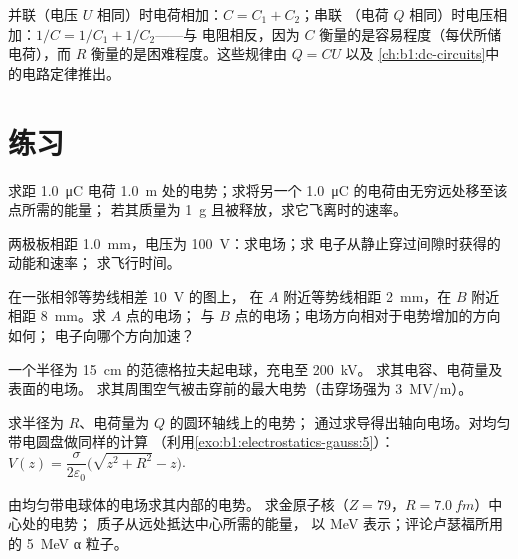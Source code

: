 \begin{remark}[电容器的组合]\label{rem:b1:potential-capacitors:association}
并联（电压 $U$ 相同）时电荷相加：$C = C_1 + C_2$；串联
（电荷 $Q$ 相同）时电压相加：$1/C = 1/C_1 + 1/C_2$——与
电阻相反，因为 $C$ 衡量的是容易程度（每伏所储电荷），而 $R$
衡量的是困难程度。这些规律由 $Q = CU$ 以及
\cref{ch:b1:dc-circuits}中的电路定律推出。
\end{remark}

\section{练习}

\begin{exercise}[$\star$]\label{exo:b1:potential-capacitors:1}
求距 \qty{1.0}{\micro C} 电荷 \qty{1.0}{m} 处的电势；求将另一个
\qty{1.0}{\micro C} 的电荷由无穷远处移至该点所需的能量；
若其质量为 \qty{1}{g} 且被释放，求它飞离时的速率。
\end{exercise}

\begin{exercise}[$\star$]\label{exo:b1:potential-capacitors:2}
两极板相距 \qty{1.0}{mm}，电压为 \qty{100}{V}：求电场；求
电子从静止穿过间隙时获得的动能和速率；
求飞行时间。
\end{exercise}

\begin{exercise}[$\star$]\label{exo:b1:potential-capacitors:3}
在一张相邻等势线相差 \qty{10}{V} 的图上，
在 $A$ 附近等势线相距 \qty{2}{mm}，在 $B$ 附近相距 \qty{8}{mm}。求 $A$ 点的电场；
与 $B$ 点的电场；电场方向相对于电势增加的方向如何；
电子向哪个方向加速？
\end{exercise}

\begin{exercise}[$\star$]\label{exo:b1:potential-capacitors:4}
一个半径为 \qty{15}{cm} 的范德格拉夫起电球，充电至 \qty{200}{kV}。
求其电容、电荷量及表面的电场。
求其周围空气被击穿前的最大电势（击穿场强为 \qty{3}{MV/m}）。
\end{exercise}

\begin{exercise}[$\star\star$]\label{exo:b1:potential-capacitors:5}
求半径为 $R$、电荷量为 $Q$ 的圆环轴线上的电势；
通过求导得出轴向电场。对均匀带电圆盘做同样的计算
（利用\cref{exo:b1:electrostatics-gauss:5}）：$V(z) = \dfrac{\sigma}{2\varepsilon_0}
\bigl(\sqrt{z^2 + R^2} - z\bigr)$.
\end{exercise}

\begin{exercise}[$\star\star$]\label{exo:b1:potential-capacitors:6}
由均匀带电球体的电场求其内部的电势。
求金原子核（$Z = 79$，$R = \qty{7.0}{fm}$）中心处的电势；
质子从远处抵达中心所需的能量，
以 \unit{MeV} 表示；评论卢瑟福所用的 \qty{5}{MeV} α 粒子。
\end{exercise}

